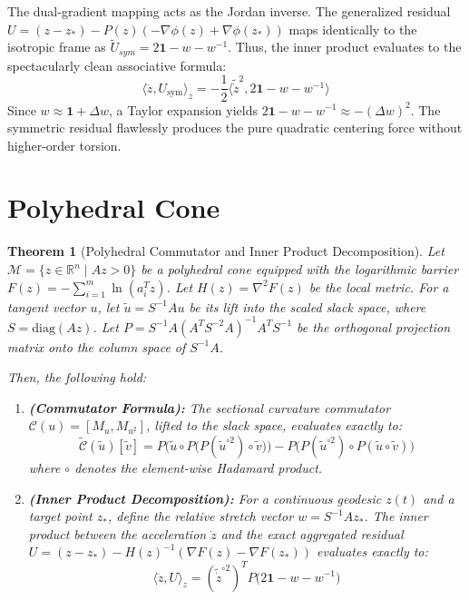 \documentclass[11pt]{article}
\newtheorem{theorem}{Theorem}
\begin{document}
The dual-gradient mapping acts as the Jordan inverse. The generalized residual $U = (z - z_*) - P(z)(-\nabla \phi(z) + \nabla \phi(z_*))$ maps identically to the isotropic frame as $\tilde{U}_{sym} = 2\mathbf{1} - w - w^{-1}$. Thus, the inner product evaluates to the spectacularly clean associative formula:
\begin{equation}
    \langle \ddot{z}, U_{\mathrm{sym}} \rangle_z = -\frac{1}{2} \langle \tilde{\dot{z}}^2, 2\mathbf{1} - w - w^{-1} \rangle
\end{equation}
Since $w \approx \mathbf{1} + \Delta w$, a Taylor expansion yields $2\mathbf{1} - w - w^{-1} \approx -(\Delta w)^2$. The symmetric residual flawlessly produces the pure quadratic centering force without higher-order torsion.

\section{Polyhedral Cone}

\begin{theorem}[Polyhedral Commutator and Inner Product Decomposition]
Let $\mathcal{M} = \{z \in \mathbb{R}^n \mid Az > 0\}$ be a polyhedral cone equipped with the logarithmic barrier $F(z) = -\sum_{i=1}^m \ln(a_i^T z)$. Let $H(z) = \nabla^2 F(z)$ be the local metric. For a tangent vector $u$, let $\tilde{u} = S^{-1}Au$ be its lift into the scaled slack space, where $S = \mathrm{diag}(Az)$. Let $P = S^{-1}A(A^TS^{-2}A)^{-1}A^TS^{-1}$ be the orthogonal projection matrix onto the column space of $S^{-1}A$.

Then, the following hold:
\begin{enumerate}
    \item \textbf{(Commutator Formula):} The sectional curvature commutator $\mathcal{C}(u) = [M_u, M_{u^2}]$, lifted to the slack space, evaluates exactly to:
    \begin{equation}
        \widetilde{\mathcal{C}}(\tilde{u})[\tilde{v}] = P \Big( \tilde{u} \circ P \big( P(\tilde{u}^{\circ 2}) \circ \tilde{v} \big) \Big) - P \Big( P(\tilde{u}^{\circ 2}) \circ P(\tilde{u} \circ \tilde{v}) \Big)
    \end{equation}
    where $\circ$ denotes the element-wise Hadamard product.
    
    \item \textbf{(Inner Product Decomposition):} For a continuous geodesic $z(t)$ and a target point $z_*$, define the relative stretch vector $w = S^{-1}Az_*$. The inner product between the acceleration $\ddot{z}$ and the exact aggregated residual $U = (z - z_*) - H(z)^{-1}(\nabla F(z) - \nabla F(z_*))$ evaluates exactly to:
    \begin{equation}
        \langle \ddot{z}, U \rangle_z = (\tilde{\dot{z}}^{\circ 2})^T P \big( 2\mathbf{1} - w - w^{-1} \big)
    \end{equation}
\end{enumerate}
\end{theorem}
\end{document}
